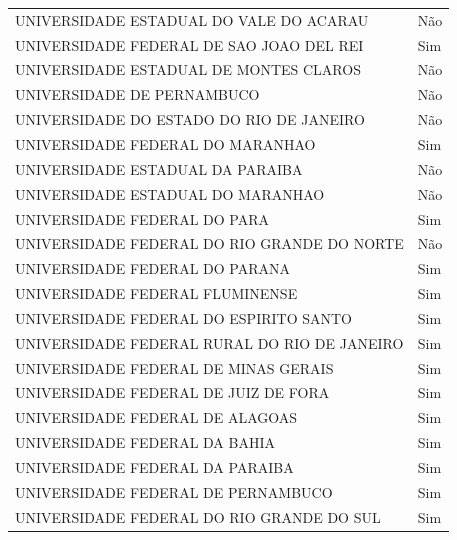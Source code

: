 {\begin{center}
\begin{longtable}[H]{ll}
\multicolumn{1}{l}{UNIVERSIDADE ESTADUAL DO VALE DO ACARAU} & \multicolumn{1}{l}{Não} \\ 
\multicolumn{1}{l}{UNIVERSIDADE FEDERAL DE SAO JOAO DEL REI} & \multicolumn{1}{l}{Sim} \\ 
\multicolumn{1}{l}{UNIVERSIDADE ESTADUAL DE MONTES CLAROS} & \multicolumn{1}{l}{Não} \\ 
\multicolumn{1}{l}{UNIVERSIDADE DE PERNAMBUCO} & \multicolumn{1}{l}{Não} \\ 
\multicolumn{1}{l}{UNIVERSIDADE DO ESTADO DO RIO DE JANEIRO} & \multicolumn{1}{l}{Não} \\ 
\multicolumn{1}{l}{UNIVERSIDADE FEDERAL DO MARANHAO} & \multicolumn{1}{l}{Sim} \\ 
\multicolumn{1}{l}{UNIVERSIDADE ESTADUAL DA PARAIBA} & \multicolumn{1}{l}{Não} \\ 
\multicolumn{1}{l}{UNIVERSIDADE ESTADUAL DO MARANHAO} & \multicolumn{1}{l}{Não} \\ 
\multicolumn{1}{l}{UNIVERSIDADE FEDERAL DO PARA} & \multicolumn{1}{l}{Sim} \\ 
\multicolumn{1}{l}{UNIVERSIDADE FEDERAL DO RIO GRANDE DO NORTE} & \multicolumn{1}{l}{Não} \\ 
\multicolumn{1}{l}{UNIVERSIDADE FEDERAL DO PARANA} & \multicolumn{1}{l}{Sim} \\ 
\multicolumn{1}{l}{UNIVERSIDADE FEDERAL FLUMINENSE} & \multicolumn{1}{l}{Sim} \\ 
\multicolumn{1}{l}{UNIVERSIDADE FEDERAL DO ESPIRITO SANTO} & \multicolumn{1}{l}{Sim} \\ 
\multicolumn{1}{l}{UNIVERSIDADE FEDERAL RURAL DO RIO DE JANEIRO} & \multicolumn{1}{l}{Sim} \\ 
\multicolumn{1}{l}{UNIVERSIDADE FEDERAL DE MINAS GERAIS} & \multicolumn{1}{l}{Sim} \\ 
\multicolumn{1}{l}{UNIVERSIDADE FEDERAL DE JUIZ DE FORA} & \multicolumn{1}{l}{Sim} \\ 
\multicolumn{1}{l}{UNIVERSIDADE FEDERAL DE ALAGOAS} & \multicolumn{1}{l}{Sim} \\ 
\multicolumn{1}{l}{UNIVERSIDADE FEDERAL DA BAHIA} & \multicolumn{1}{l}{Sim} \\ 
\multicolumn{1}{l}{UNIVERSIDADE FEDERAL DA PARAIBA} & \multicolumn{1}{l}{Sim} \\ 
\multicolumn{1}{l}{UNIVERSIDADE FEDERAL DE PERNAMBUCO} & \multicolumn{1}{l}{Sim} \\ 
\multicolumn{1}{l}{UNIVERSIDADE FEDERAL DO RIO GRANDE DO SUL} & \multicolumn{1}{l}{Sim} \\ 

\end{longtable}
\end{center}}
